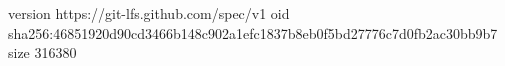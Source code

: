 version https://git-lfs.github.com/spec/v1
oid sha256:46851920d90cd3466b148c902a1efc1837b8eb0f5bd27776c7d0fb2ac30bb9b7
size 316380
